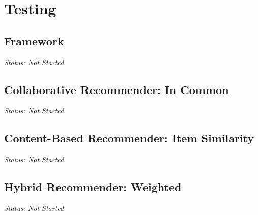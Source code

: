 \chapter{Testing}

\section{Framework}

\emph{Status: Not Started}

\section{Collaborative Recommender: In Common}

\emph{Status: Not Started}

\section{Content-Based Recommender: Item Similarity}

\emph{Status: Not Started}

\section{Hybrid Recommender: Weighted}

\emph{Status: Not Started}

